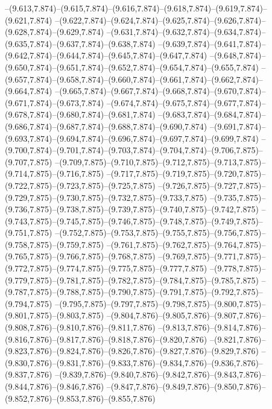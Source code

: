   --(9.613,7.874)--(9.615,7.874)--(9.616,7.874)--(9.618,7.874)--(9.619,7.874)--(9.621,7.874)%
  --(9.622,7.874)--(9.624,7.874)--(9.625,7.874)--(9.626,7.874)--(9.628,7.874)--(9.629,7.874)%
  --(9.631,7.874)--(9.632,7.874)--(9.634,7.874)--(9.635,7.874)--(9.637,7.874)--(9.638,7.874)%
  --(9.639,7.874)--(9.641,7.874)--(9.642,7.874)--(9.644,7.874)--(9.645,7.874)--(9.647,7.874)%
  --(9.648,7.874)--(9.650,7.874)--(9.651,7.874)--(9.652,7.874)--(9.654,7.874)--(9.655,7.874)%
  --(9.657,7.874)--(9.658,7.874)--(9.660,7.874)--(9.661,7.874)--(9.662,7.874)--(9.664,7.874)%
  --(9.665,7.874)--(9.667,7.874)--(9.668,7.874)--(9.670,7.874)--(9.671,7.874)--(9.673,7.874)%
  --(9.674,7.874)--(9.675,7.874)--(9.677,7.874)--(9.678,7.874)--(9.680,7.874)--(9.681,7.874)%
  --(9.683,7.874)--(9.684,7.874)--(9.686,7.874)--(9.687,7.874)--(9.688,7.874)--(9.690,7.874)%
  --(9.691,7.874)--(9.693,7.874)--(9.694,7.874)--(9.696,7.874)--(9.697,7.874)--(9.699,7.874)%
  --(9.700,7.874)--(9.701,7.874)--(9.703,7.874)--(9.704,7.874)--(9.706,7.875)--(9.707,7.875)%
  --(9.709,7.875)--(9.710,7.875)--(9.712,7.875)--(9.713,7.875)--(9.714,7.875)--(9.716,7.875)%
  --(9.717,7.875)--(9.719,7.875)--(9.720,7.875)--(9.722,7.875)--(9.723,7.875)--(9.725,7.875)%
  --(9.726,7.875)--(9.727,7.875)--(9.729,7.875)--(9.730,7.875)--(9.732,7.875)--(9.733,7.875)%
  --(9.735,7.875)--(9.736,7.875)--(9.738,7.875)--(9.739,7.875)--(9.740,7.875)--(9.742,7.875)%
  --(9.743,7.875)--(9.745,7.875)--(9.746,7.875)--(9.748,7.875)--(9.749,7.875)--(9.751,7.875)%
  --(9.752,7.875)--(9.753,7.875)--(9.755,7.875)--(9.756,7.875)--(9.758,7.875)--(9.759,7.875)%
  --(9.761,7.875)--(9.762,7.875)--(9.764,7.875)--(9.765,7.875)--(9.766,7.875)--(9.768,7.875)%
  --(9.769,7.875)--(9.771,7.875)--(9.772,7.875)--(9.774,7.875)--(9.775,7.875)--(9.777,7.875)%
  --(9.778,7.875)--(9.779,7.875)--(9.781,7.875)--(9.782,7.875)--(9.784,7.875)--(9.785,7.875)%
  --(9.787,7.875)--(9.788,7.875)--(9.790,7.875)--(9.791,7.875)--(9.792,7.875)--(9.794,7.875)%
  --(9.795,7.875)--(9.797,7.875)--(9.798,7.875)--(9.800,7.875)--(9.801,7.875)--(9.803,7.875)%
  --(9.804,7.876)--(9.805,7.876)--(9.807,7.876)--(9.808,7.876)--(9.810,7.876)--(9.811,7.876)%
  --(9.813,7.876)--(9.814,7.876)--(9.816,7.876)--(9.817,7.876)--(9.818,7.876)--(9.820,7.876)%
  --(9.821,7.876)--(9.823,7.876)--(9.824,7.876)--(9.826,7.876)--(9.827,7.876)--(9.829,7.876)%
  --(9.830,7.876)--(9.831,7.876)--(9.833,7.876)--(9.834,7.876)--(9.836,7.876)--(9.837,7.876)%
  --(9.839,7.876)--(9.840,7.876)--(9.842,7.876)--(9.843,7.876)--(9.844,7.876)--(9.846,7.876)%
  --(9.847,7.876)--(9.849,7.876)--(9.850,7.876)--(9.852,7.876)--(9.853,7.876)--(9.855,7.876)%
